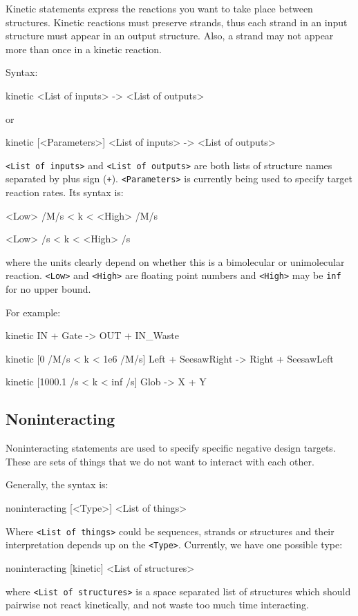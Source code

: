 \documentclass{article}
\newenvironment{code}
{\vspace{-0.1in}\par\begin{list}{}{
\setlength{\listparindent}{0pt}
\raggedright
\setlength{\itemsep}{0pt}
\setlength{\parsep}{0pt}
\normalfont\ttfamily}
 \item[]}
{\end{list}\vspace{-0.1in}}
\begin{document}
Kinetic statements express the reactions you want to take place between
structures. Kinetic reactions must preserve strands, thus each strand
in an input structure must appear in an output structure. Also, a
strand may not appear more than once in a kinetic reaction.

Syntax:
\begin{code}
kinetic <List of inputs> -> <List of outputs>
\end{code}
or
\begin{code}
kinetic [<Parameters>] <List of inputs> -> <List of outputs>
\end{code}
\texttt{<List of inputs>} and \texttt{<List of outputs>} are both lists of structure
names separated by plus sign (\texttt{+}). \texttt{<Parameters>} is currently being
used to specify target reaction rates. Its syntax is:
\begin{code}
<Low> /M/s < k < <High> /M/s

<Low> /s < k < <High> /s
\end{code}
where the units clearly depend on whether this is a bimolecular or
unimolecular reaction. \texttt{<Low>} and \texttt{<High>} are floating point numbers
and \texttt{<High>} may be \texttt{inf} for no upper bound.

For example:
\begin{code}
kinetic IN + Gate -> OUT + IN\_Waste

kinetic [0 /M/s < k < 1e6 /M/s] Left + SeesawRight -> Right + SeesawLeft

kinetic [1000.1 /s < k < inf /s] Glob -> X + Y
\end{code}

\subsection{Noninteracting}

Noninteracting statements are used to specify specific negative design
targets. These are sets of things that we do not want to interact
with each other.

Generally, the syntax is:
\begin{code}
noninteracting [<Type>] <List of things>
\end{code}
Where \texttt{<List of things>} could be sequences, strands or structures and
their interpretation depends up on the \texttt{<Type>}. Currently, we have
one possible type:
\begin{code}
noninteracting [kinetic] <List of structures>
\end{code}
where \texttt{<List of structures>} is a space separated list of structures
which should pairwise not react kinetically, and not waste too much
time interacting. 
\end{document}
